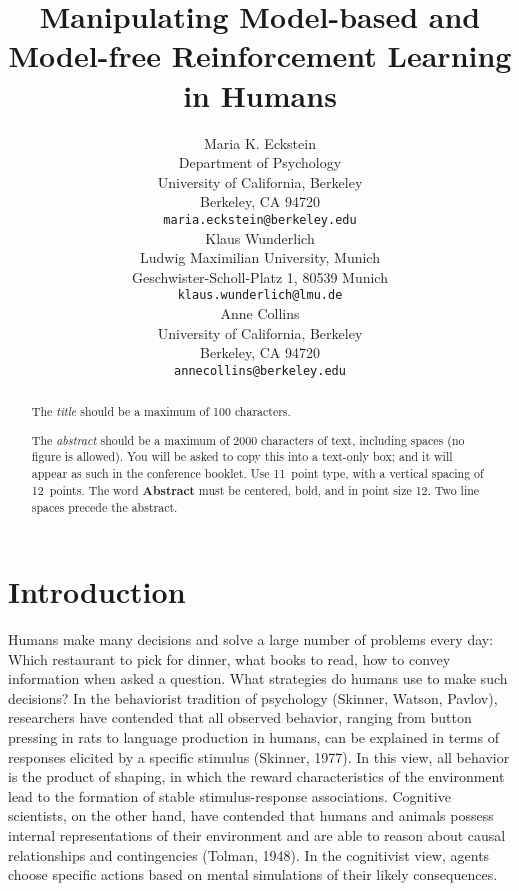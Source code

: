 \documentclass[11pt]{article} %
\title{Manipulating Model-based and Model-free Reinforcement Learning in Humans}
\author{
Maria K. Eckstein \\
Department of Psychology\\
University of California, Berkeley\\
Berkeley, CA 94720 \\
\texttt{maria.eckstein@berkeley.edu} \\
\And
Klaus Wunderlich \\
Ludwig Maximilian University, Munich \\
Geschwister-Scholl-Platz 1, 80539 Munich \\
\texttt{klaus.wunderlich@lmu.de} \\
\And
Anne Collins \\
University of California, Berkeley \\
Berkeley, CA 94720  \\
\texttt{annecollins@berkeley.edu} \\
}
\begin{document}
\maketitle

\begin{abstract}
The \emph{title} should be a maximum of 100 characters. 

The \emph{abstract} should be a maximum of 2000 characters of text,
including spaces (no figure is allowed). You will be asked to copy
this into a text-only box; and it will appear as such in the
conference booklet. Use 11~point type, with a vertical spacing of
12~points.  The word \textbf{Abstract} must be centered, bold, and in
point size 12. Two line spaces precede the abstract.
\end{abstract}




\startmain %

\section{Introduction}

Humans make many decisions and solve a large number of problems every day: Which restaurant to pick for dinner, what books to read, how to convey information when asked a question. What strategies do humans use to make such decisions? In the behaviorist tradition of psychology (Skinner, Watson, Pavlov), researchers have contended that all observed behavior, ranging from button pressing in rats to language production in humans, can be explained in terms of responses elicited by a specific stimulus (Skinner, 1977). In this view, all behavior is the product of shaping, in which the reward characteristics of the environment lead to the formation of stable stimulus-response associations. Cognitive scientists, on the other hand, have contended that humans and animals possess internal representations of their environment and are able to reason about causal relationships and contingencies (Tolman, 1948). In the cognitivist view, agents choose specific actions based on mental simulations of their likely consequences.
\end{document}

